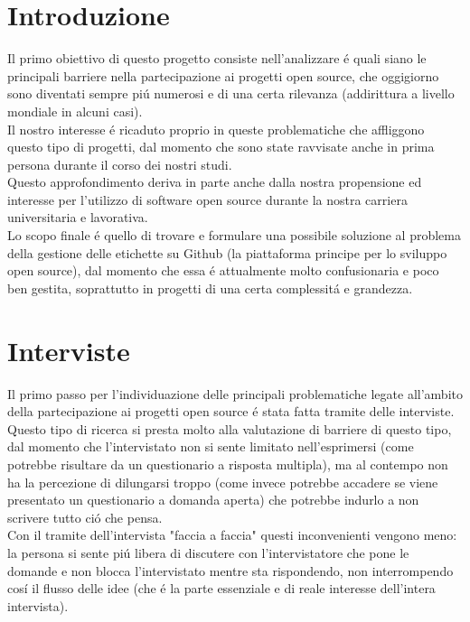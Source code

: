 \documentclass[12pt]{article} %
\begin{document}
\section{Introduzione}
Il primo obiettivo di questo progetto consiste nell'analizzare \'e quali siano le principali barriere nella partecipazione ai progetti open source, che oggigiorno sono diventati sempre pi\'u numerosi e di una certa rilevanza (addirittura a livello mondiale in alcuni casi).\\
Il nostro interesse \'e ricaduto proprio in queste problematiche che affliggono questo tipo di progetti, dal momento che sono state ravvisate anche in prima persona durante il corso dei nostri studi.\\
Questo approfondimento deriva in parte anche dalla nostra propensione ed interesse per l'utilizzo di software open source durante la nostra carriera universitaria e lavorativa.\\
Lo scopo finale \'e quello di trovare e formulare una possibile soluzione al problema della gestione delle etichette su Github (la piattaforma principe per lo sviluppo open source), dal momento che essa \'e attualmente molto confusionaria e poco ben gestita, soprattutto in progetti di una certa complessit\'a e grandezza.
\newpage

\section{Interviste}
Il primo passo per l'individuazione delle principali problematiche legate all'ambito della partecipazione ai progetti open source \'e stata fatta tramite delle interviste. Questo tipo di ricerca si presta molto alla valutazione di barriere di questo tipo, dal momento che l'intervistato non si sente limitato nell'esprimersi (come potrebbe risultare da un questionario a risposta multipla), ma al contempo non ha la percezione di dilungarsi troppo (come invece potrebbe accadere se viene presentato un questionario a domanda aperta) che potrebbe indurlo a non scrivere tutto ci\'o che pensa.\\
Con il tramite dell'intervista "faccia a faccia" questi inconvenienti vengono meno: la persona si sente pi\'u libera di discutere con l'intervistatore che pone le domande e non blocca l'intervistato mentre sta rispondendo, non interrompendo cos\'i il flusso delle idee (che \'e la parte essenziale e di reale interesse dell'intera intervista).\\
\end{document}
